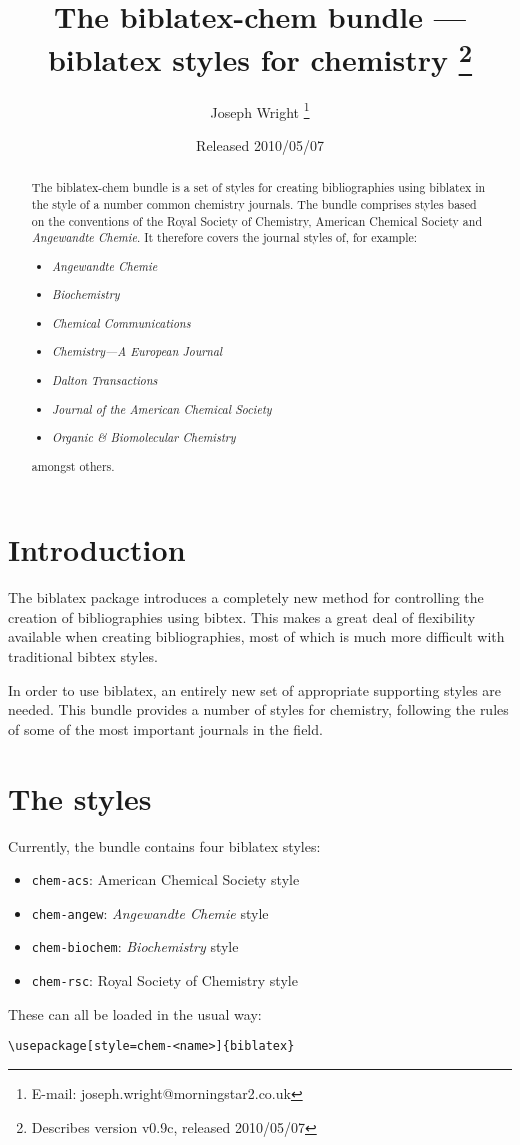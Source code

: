 \documentclass[a4paper]{article}
\title{The \textsf{biblatex-chem} bundle --- 
  \textsf{biblatex} styles for chemistry%
  \thanks{Describes version v0.9c, released 2010/05/07}}
\author{Joseph Wright%
  \thanks{E-mail: joseph.wright@morningstar2.co.uk}}
\date{Released 2010/05/07}
\begin{document}
\maketitle
\begin{abstract}
The \textsf{biblatex-chem} bundle is a set of styles for 
creating bibliographies using \textsf{biblatex} in the style of
a number common chemistry journals.  The bundle comprises styles
based on the conventions of the Royal Society of Chemistry, 
American Chemical Society and 	\emph{Angewandte Chemie}. It
therefore covers the journal styles of, for example:
\begin{itemize}
  \item \emph{Angewandte Chemie}
  \item \emph{Biochemistry}
  \item \emph{Chemical Communications}
  \item \emph{Chemistry---A European Journal}
  \item \emph{Dalton Transactions}
  \item \emph{Journal of the American Chemical Society}
  \item \emph{Organic \& Biomolecular Chemistry}
\end{itemize}
amongst others.
\end{abstract}

\begin{multicols}{2}
  \tableofcontents
\end{multicols}

\section{Introduction}
The \textsf{biblatex} package introduces a completely new method
for controlling the creation of bibliographies using
\textsf{bibtex}. This makes a great deal of flexibility 
available when creating bibliographies, most of which is much 
more difficult with traditional \textsf{bibtex} styles.

In order to use \textsf{biblatex}, an entirely new set of 
appropriate supporting styles are needed. This bundle provides a
number of styles for chemistry, following the rules of some of 
the most important journals in the field. 

\section{The styles}

Currently, the bundle contains four \textsf{biblatex} styles:
\begin{itemize}
  \item \texttt{chem-acs}: American Chemical Society style
  \item \texttt{chem-angew}: \emph{Angewandte Chemie} style
  \item \texttt{chem-biochem}: \emph{Biochemistry} style
  \item \texttt{chem-rsc}: Royal Society of Chemistry style
\end{itemize}
These can all be loaded in the usual way:
\begin{verbatim}
\usepackage[style=chem-<name>]{biblatex}
\end{verbatim}
\end{document}

